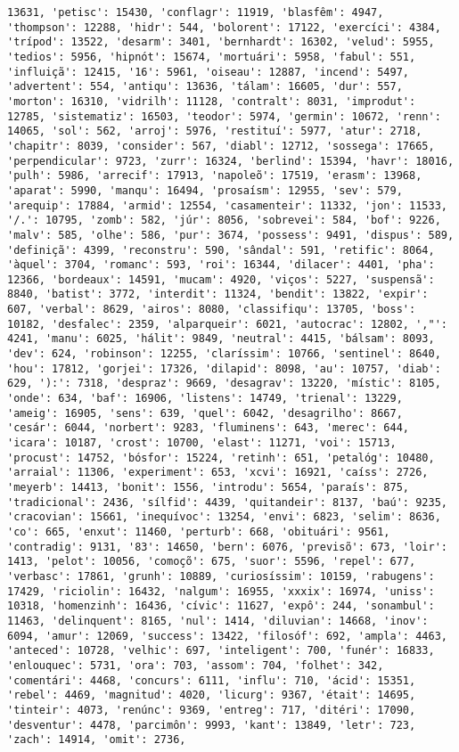 \begin{Verbatim}[commandchars=\\\{\}]
13631, 'petisc': 15430, 'conflagr': 11919, 'blasfêm': 4947, 'thompson': 12288, 'hidr': 544, 'bolorent': 17122, 'exercíci': 4384, 'trípod': 13522, 'desarm': 3401, 'bernhardt': 16302, 'velud': 5955, 'tedios': 5956, 'hipnót': 15674, 'mortuári': 5958, 'fabul': 551, 'influiçã': 12415, '16': 5961, 'oiseau': 12887, 'incend': 5497, 'advertent': 554, 'antiqu': 13636, 'tálam': 16605, 'dur': 557, 'morton': 16310, 'vidrilh': 11128, 'contralt': 8031, 'improdut': 12785, 'sistematiz': 16503, 'teodor': 5974, 'germin': 10672, 'renn': 14065, 'sol': 562, 'arroj': 5976, 'restituí': 5977, 'atur': 2718, 'chapitr': 8039, 'consider': 567, 'diabl': 12712, 'sossega': 17665, 'perpendicular': 9723, 'zurr': 16324, 'berlind': 15394, 'havr': 18016, 'pulh': 5986, 'arrecif': 17913, 'napoleõ': 17519, 'erasm': 13968, 'aparat': 5990, 'manqu': 16494, 'prosaísm': 12955, 'sev': 579, 'arequip': 17884, 'armid': 12554, 'casamenteir': 11332, 'jon': 11533, '/.': 10795, 'zomb': 582, 'júr': 8056, 'sobrevei': 584, 'bof': 9226, 'malv': 585, 'olhe': 586, 'pur': 3674, 'possess': 9491, 'dispus': 589, 'definiçã': 4399, 'reconstru': 590, 'sândal': 591, 'retific': 8064, 'àquel': 3704, 'romanc': 593, 'roi': 16344, 'dilacer': 4401, 'pha': 12366, 'bordeaux': 14591, 'mucam': 4920, 'viços': 5227, 'suspensã': 8840, 'batist': 3772, 'interdit': 11324, 'bendit': 13822, 'expir': 607, 'verbal': 8629, 'airos': 8080, 'classifiqu': 13705, 'boss': 10182, 'desfalec': 2359, 'alparqueir': 6021, 'autocrac': 12802, ',"': 4241, 'manu': 6025, 'hálit': 9849, 'neutral': 4415, 'bálsam': 8093, 'dev': 624, 'robinson': 12255, 'claríssim': 10766, 'sentinel': 8640, 'hou': 17812, 'gorjei': 17326, 'dilapid': 8098, 'au': 10757, 'diab': 629, '):': 7318, 'despraz': 9669, 'desagrav': 13220, 'místic': 8105, 'onde': 634, 'baf': 16906, 'listens': 14749, 'trienal': 13229, 'ameig': 16905, 'sens': 639, 'quel': 6042, 'desagrilho': 8667, 'cesár': 6044, 'norbert': 9283, 'fluminens': 643, 'merec': 644, 'icara': 10187, 'crost': 10700, 'elast': 11271, 'voi': 15713, 'procust': 14752, 'bósfor': 15224, 'retinh': 651, 'petalóg': 10480, 'arraial': 11306, 'experiment': 653, 'xcvi': 16921, 'caíss': 2726, 'meyerb': 14413, 'bonit': 1556, 'introdu': 5654, 'paraís': 875, 'tradicional': 2436, 'sílfid': 4439, 'quitandeir': 8137, 'baú': 9235, 'cracovian': 15661, 'inequívoc': 13254, 'envi': 6823, 'selim': 8636, 'co': 665, 'enxut': 11460, 'perturb': 668, 'obituári': 9561, 'contradig': 9131, '83': 14650, 'bern': 6076, 'previsõ': 673, 'loir': 1413, 'pelot': 10056, 'comoçõ': 675, 'suor': 5596, 'repel': 677, 'verbasc': 17861, 'grunh': 10889, 'curiosíssim': 10159, 'rabugens': 17429, 'riciolin': 16432, 'nalgum': 16955, 'xxxix': 16974, 'uniss': 10318, 'homenzinh': 16436, 'cívic': 11627, 'expô': 244, 'sonambul': 11463, 'delinquent': 8165, 'nul': 1414, 'diluvian': 14668, 'inov': 6094, 'amur': 12069, 'success': 13422, 'filosóf': 692, 'ampla': 4463, 'anteced': 10728, 'velhic': 697, 'inteligent': 700, 'funér': 16833, 'enlouquec': 5731, 'ora': 703, 'assom': 704, 'folhet': 342, 'comentári': 4468, 'concurs': 6111, 'influ': 710, 'ácid': 15351, 'rebel': 4469, 'magnitud': 4020, 'licurg': 9367, 'était': 14695, 'tinteir': 4073, 'renúnc': 9369, 'entreg': 717, 'ditéri': 17090, 'desventur': 4478, 'parcimôn': 9993, 'kant': 13849, 'letr': 723, 'zach': 14914, 'omit': 2736, 
\end{Verbatim}
